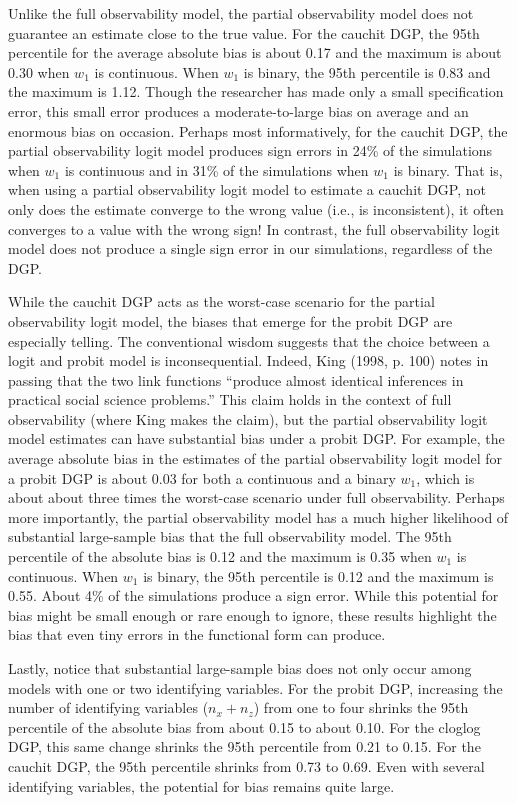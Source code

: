 \documentclass[10pt]{article}
\begin{document}
Unlike the full observability model, the partial observability model does not guarantee an estimate close to the true value. 
For the cauchit DGP, the 95th percentile for the average absolute bias is about 0.17 and the maximum is about 0.30 when $w_1$ is continuous. When $w_1$ is binary, the 95th percentile is 0.83 and the maximum is 1.12. 
Though the researcher has made only a small specification error, this small error produces a moderate-to-large bias on average and an enormous bias on occasion. 
Perhaps most informatively, for the cauchit DGP, the partial observability logit model produces sign errors in 24\% of the simulations when $w_1$ is continuous and in 31\% of the simulations when $w_1$ is binary. 
That is, when using a partial observability logit model to estimate a cauchit DGP, not only does the estimate converge to the wrong value (i.e., is inconsistent), it often converges to a value with the wrong sign!
In contrast, the full observability logit model does not produce a single sign error in our simulations, regardless of the DGP.

While the cauchit DGP acts as the worst-case scenario for the partial observability logit model, the biases that emerge for the probit DGP are especially telling. 
The conventional wisdom suggests that the choice between a logit and probit model is inconsequential. 
Indeed, King (1998, p. 100) notes in passing that the two link functions ``produce almost identical inferences in practical social science problems.'' 
This claim holds in the context of full observability (where King makes the claim), but the partial observability logit model estimates can have substantial bias under a probit DGP. 
For example, the average absolute bias in the estimates of the partial observability logit model for a probit DGP is about 0.03 for both a continuous and a binary $w_1$, which is about about three times the worst-case scenario under full observability.  
Perhaps more importantly, the partial observability model has a much higher likelihood of substantial large-sample bias that the full observability model. 
The 95th percentile of the absolute bias is 0.12 and the maximum is 0.35 when $w_1$ is continuous. When $w_1$ is binary, the 95th percentile is 0.12 and the maximum is 0.55.
About 4\% of the simulations produce a sign error. 
While this potential for bias might be small enough or rare enough to ignore, these results highlight the bias that even tiny errors in the functional form can produce.

Lastly, notice that substantial large-sample bias does not only occur among models with one or two identifying variables. 
For the probit DGP, increasing the number of identifying variables ($n_x + n_z$) from one to four shrinks the 95th percentile of the absolute bias from about 0.15 to about 0.10. 
For the cloglog DGP, this same change shrinks the 95th percentile from 0.21 to 0.15. 
For the cauchit DGP, the 95th percentile shrinks from 0.73 to 0.69. 
Even with several identifying variables, the potential for bias remains quite large.
 
\end{document}
